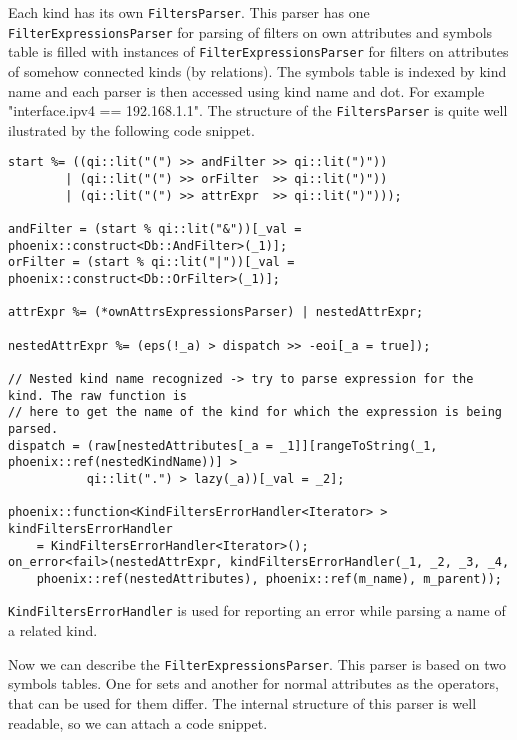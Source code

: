 \documentclass[deska]{subfiles}
\begin{document}
Each kind has its own {\tt FiltersParser}. This parser has one {\tt FilterExpressionsParser} for parsing of filters
on own attributes and symbols table is filled with instances of {\tt FilterExpressionsParser} for filters on attributes
of somehow connected kinds (by relations). The symbols table is indexed by kind name and each parser is then accessed
using kind name and dot. For example "interface.ipv4 == 192.168.1.1". The structure of the {\tt FiltersParser} is quite
well ilustrated by the following code snippet.

\begin{verbatim}
start %= ((qi::lit("(") >> andFilter >> qi::lit(")"))
        | (qi::lit("(") >> orFilter  >> qi::lit(")"))
        | (qi::lit("(") >> attrExpr  >> qi::lit(")")));

andFilter = (start % qi::lit("&"))[_val = phoenix::construct<Db::AndFilter>(_1)];
orFilter = (start % qi::lit("|"))[_val = phoenix::construct<Db::OrFilter>(_1)];

attrExpr %= (*ownAttrsExpressionsParser) | nestedAttrExpr;

nestedAttrExpr %= (eps(!_a) > dispatch >> -eoi[_a = true]);

// Nested kind name recognized -> try to parse expression for the kind. The raw function is
// here to get the name of the kind for which the expression is being parsed.
dispatch = (raw[nestedAttributes[_a = _1]][rangeToString(_1, phoenix::ref(nestedKindName))] >
           qi::lit(".") > lazy(_a))[_val = _2];

phoenix::function<KindFiltersErrorHandler<Iterator> > kindFiltersErrorHandler
    = KindFiltersErrorHandler<Iterator>();
on_error<fail>(nestedAttrExpr, kindFiltersErrorHandler(_1, _2, _3, _4,
    phoenix::ref(nestedAttributes), phoenix::ref(m_name), m_parent));
\end{verbatim}

{\tt KindFiltersErrorHandler} is used for reporting an error while parsing a name of a related kind.

Now we can describe the {\tt FilterExpressionsParser}. This parser is based on two symbols tables. One for sets and another
for normal attributes as the operators, that can be used for them differ. The internal structure of this parser is well
readable, so we can attach a code snippet.
\end{document}
